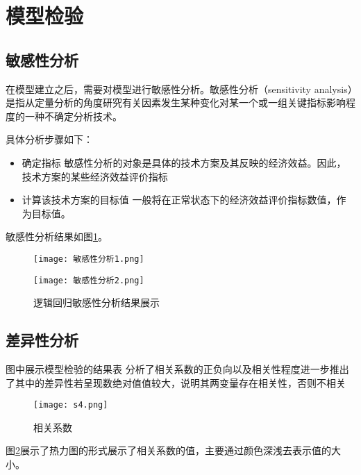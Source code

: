 \section{模型检验}
\subsection{敏感性分析}
在模型建立之后，需要对模型进行敏感性分析。敏感性分析（sensitivity analysis）是指从定量分析的角度研究有关因素发生某种变化对某一个或一组关键指标影响程度的一种不确定分析技术。

具体分析步骤如下：
\begin{itemize}
	\item 确定指标
	敏感性分析的对象是具体的技术方案及其反映的经济效益。因此，技术方案的某些经济效益评价指标
	\item 计算该技术方案的目标值
	一般将在正常状态下的经济效益评价指标数值，作为目标值。
\end{itemize}

敏感性分析结果如图\ref{p-15}。
\begin{figure}[h]
	\centering
	\begin{minipage}[b]{0.45\linewidth}
		\texttt{[image: 敏感性分析1.png]}		
	\end{minipage}
	\begin{minipage}[b]{0.45\linewidth}
		\texttt{[image: 敏感性分析2.png]}
	\end{minipage}
	\setlength{\abovecaptionskip}{3pt}%
	\caption{逻辑回归敏感性分析结果展示}
	\label{p-15}
\end{figure}

\subsection{差异性分析}
图中展示模型检验的结果表 分析了相关系数的正负向以及相关性程度进一步推出了其中的差异性若呈现数绝对值值较大，说明其两变量存在相关性，否则不相关

\begin{figure}[!h]
	\centering
	\texttt{[image: s4.png]}
	\setlength{\abovecaptionskip}{3pt}%
	\caption{相关系数}
	\label{p-17}
\end{figure}

图\ref{p-17}展示了热力图的形式展示了相关系数的值，主要通过颜色深浅去表示值的大小。